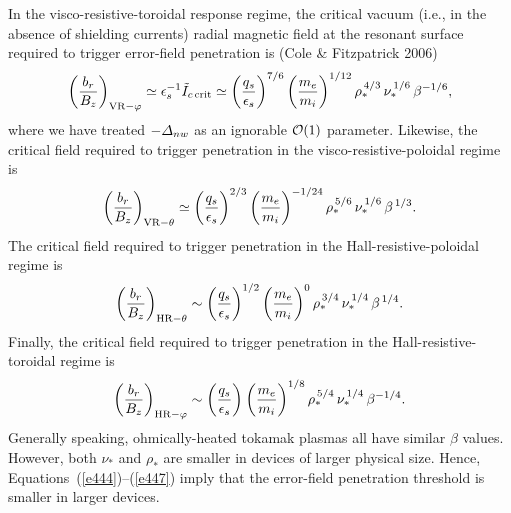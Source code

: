 \documentclass[notitlepage,12pt]{article}
\begin{document}
In the visco-resistive-toroidal response regime, the critical vacuum (i.e., in the absence of shielding currents) radial magnetic
field at the resonant surface required to
trigger error-field penetration is (Cole \& Fitzpatrick 2006)
\begin{equation}\label{e444}
\left(\frac{b_{r}}{B_z}\right)_{{\rm VR}-\varphi} \simeq \epsilon_s^{-1}\tilde{I}_{c\,{\rm crit}}\simeq \left(\frac{q_s}{\epsilon_s}\right)^{7/6}\left(\frac{m_e}{m_i}\right)^{1/12}
\rho_\ast^{\,4/3}\,\nu_\ast^{\,1/6}\,\beta^{-1/6},
\end{equation}
where we have treated $-{\mit\Delta}_{nw}$ as an ignorable ${\cal O}(1)$ parameter. Likewise,  the critical
field required to trigger penetration in the visco-resistive-poloidal regime is
\begin{equation}
\left(\frac{b_{r}}{B_z}\right)_{{\rm VR}-\theta} \simeq  \left(\frac{q_s}{\epsilon_s}\right)^{2/3}\left(\frac{m_e}{m_i}\right)^{-1/24}
\rho_\ast^{\,5/6}\,\nu_\ast^{\,1/6}\,\beta^{\,1/3}.
\end{equation}
The critical field required to trigger penetration in the Hall-resistive-poloidal regime is
\begin{equation}
\left(\frac{b_{r}}{B_z}\right)_{{\rm HR}-\theta} \sim  \left(\frac{q_s}{\epsilon_s}\right)^{1/2}\left(\frac{m_e}{m_i}\right)^{0}
\rho_\ast^{\,3/4}\,\nu_\ast^{\,1/4}\,\beta^{\,1/4}.
\end{equation}
Finally, the critical field 
required to  trigger penetration in the Hall-resistive-toroidal regime is
\begin{equation}
\left(\frac{b_{r}}{B_z}\right)_{{\rm HR}-\varphi} \sim  \left(\frac{q_s}{\epsilon_s}\right)^{}\left(\frac{m_e}{m_i}\right)^{1/8}
\rho_\ast^{\,5/4}\,\nu_\ast^{\,1/4}\,\beta^{-1/4}.\label{e447}
\end{equation}
Generally speaking, ohmically-heated tokamak plasmas all  have similar $\beta$ values. However,
both $\nu_\ast$ and $\rho_\ast$ are smaller in devices of larger physical size. Hence, Equations~(\ref{e444})--(\ref{e447})
imply that the error-field penetration threshold is smaller in larger devices. 
\end{document}

